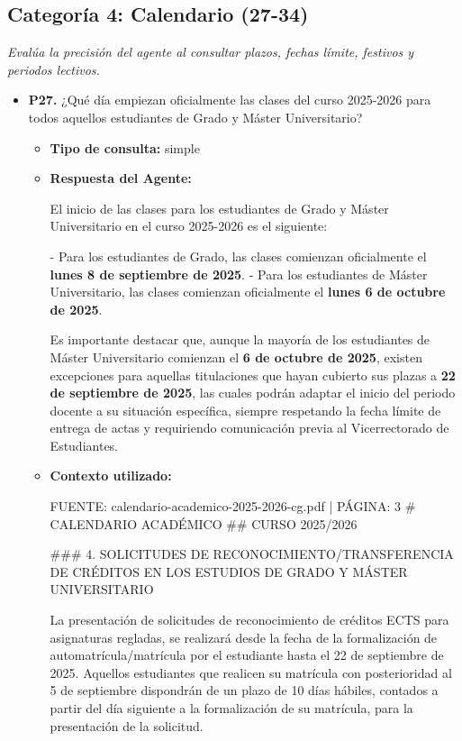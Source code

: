 \documentclass{article}
\begin{document}
\subsection{Categoría 4: Calendario (27-34)}
\textit{Evalúa la precisión del agente al consultar plazos, fechas límite, festivos y periodos lectivos.}
\begin{itemize}
  \item \textbf{P27.} ¿Qué día empiezan oficialmente las clases del curso 2025-2026 para todos aquellos estudiantes de Grado y Máster Universitario? \\
        \begin{itemize}
          \item \textbf{Tipo de consulta:} simple
          \item \textbf{Respuesta del Agente:}

                El inicio de las clases para los estudiantes de Grado y Máster Universitario en el curso 2025-2026 es el siguiente:

                - Para los estudiantes de Grado, las clases comienzan oficialmente el \textbf{lunes 8 de septiembre de 2025}.
                - Para los estudiantes de Máster Universitario, las clases comienzan oficialmente el \textbf{lunes 6 de octubre de 2025}.

                Es importante destacar que, aunque la mayoría de los estudiantes de Máster Universitario comienzan el \textbf{6 de octubre de 2025}, existen excepciones para aquellas titulaciones que hayan cubierto sus plazas a \textbf{22 de septiembre de 2025}, las cuales podrán adaptar el inicio del periodo docente a su situación específica, siempre respetando la fecha límite de entrega de actas y requiriendo comunicación previa al Vicerrectorado de Estudiantes.
          \item \textbf{Contexto utilizado:}
                \begin{scriptsize}
                  FUENTE: calendario-academico-2025-2026-cg.pdf | PÁGINA: 3
                  \# CALENDARIO ACADÉMICO
                  \#\# CURSO 2025/2026

                  \#\#\# 4. SOLICITUDES DE RECONOCIMIENTO/TRANSFERENCIA DE CRÉDITOS EN LOS ESTUDIOS DE GRADO Y MÁSTER UNIVERSITARIO

                  La presentación de solicitudes de reconocimiento de créditos ECTS para asignaturas regladas, se realizará desde la fecha de la formalización de automatrícula/matrícula por el estudiante hasta el 22 de septiembre de 2025. Aquellos estudiantes que realicen su matrícula con posterioridad al 5 de septiembre dispondrán de un plazo de 10 días hábiles, contados a partir del día siguiente a la formalización de su matrícula, para la presentación de la solicitud.


\end{scriptsize}
\end{itemize}
\end{itemize}
\end{document}
